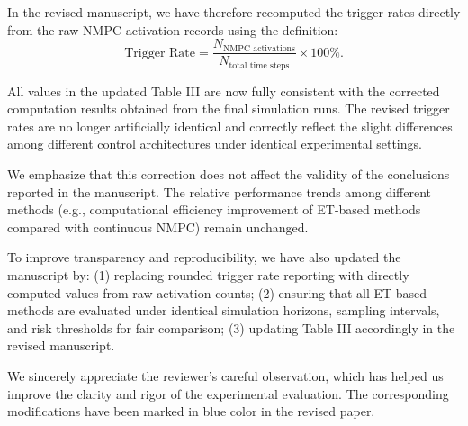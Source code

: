 \documentclass[12pt, twosides]{article}
\theoremstyle{definition}
\begin{document}
In the revised manuscript, we have therefore recomputed the trigger rates directly from the raw NMPC activation records using the definition:
\[
\text{Trigger Rate} = \frac{N_{\text{NMPC activations}}}{N_{\text{total time steps}}} \times 100\%.
\]

All values in the updated Table III are now fully consistent with the corrected computation results obtained from the final simulation runs. The revised trigger rates are no longer artificially identical and correctly reflect the slight differences among different control architectures under identical experimental settings.

We emphasize that this correction does not affect the validity of the conclusions reported in the manuscript. The relative performance trends among different methods (e.g., computational efficiency improvement of ET-based methods compared with continuous NMPC) remain unchanged.

To improve transparency and reproducibility, we have also updated the manuscript by:
(1) replacing rounded trigger rate reporting with directly computed values from raw activation counts;  
(2) ensuring that all ET-based methods are evaluated under identical simulation horizons, sampling intervals, and risk thresholds for fair comparison;  
(3) updating Table III accordingly in the revised manuscript.

We sincerely appreciate the reviewer's careful observation, which has helped us improve the clarity and rigor of the experimental evaluation. The corresponding modifications have been marked in blue color in the revised paper.
\end{document}
